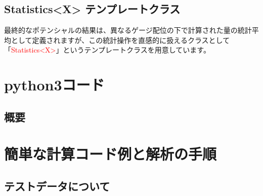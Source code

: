 \documentclass[12pt, a4paper]{jsarticle}
\begin{document}
\subsection{Statistics<X> テンプレートクラス} \label{sec:C_Class_Statistics}
最終的なポテンシャルの結果は、異なるゲージ配位の下で計算された量の統計平均として定義されますが、この統計操作を直感的に扱えるクラスとして「\textcolor{red}{Statistics<X>}」というテンプレートクラスを用意しています。
\section{python3コード}
\subsection{概要}
\section{簡単な計算コード例と解析の手順}
\subsection{テストデータについて}

\end{document}
